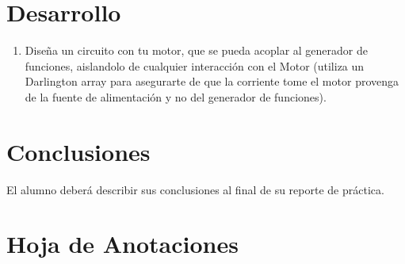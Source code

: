 \section{Desarrollo}
	
	\begin{enumerate}
		\item Diseña un circuito con tu motor, que se pueda acoplar al generador de funciones, aislandolo de cualquier interacción con el Motor (utiliza un Darlington array para asegurarte de que la corriente tome el motor provenga de la fuente de alimentación y no del generador de funciones).
	\end{enumerate}



\section{Conclusiones}

	El alumno deberá describir sus conclusiones al final de su reporte de práctica.
    

\clearpage
\section{Hoja de Anotaciones}
	
